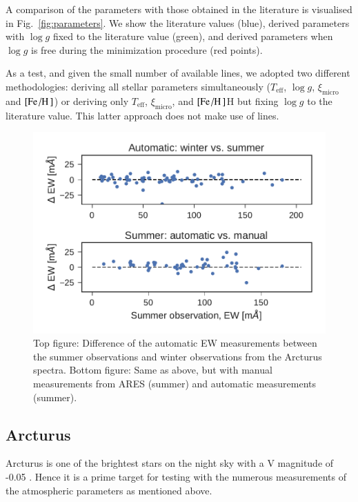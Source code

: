 \documentclass{aa}
\begin{document}
A comparison of the parameters with those obtained in the literature is visualised in
Fig.~\ref{fig:parameters}. We show the literature values (blue), derived parameters with $\log g$
fixed to the literature value (green), and derived parameters when $\log g$ is free during the
minimization procedure (red points).

As a test, and given the small number of available  lines, we adopted two different
methodologies: deriving all stellar parameters simultaneously ($T_\mathrm{eff}$, $\log g$,
$\xi_\mathrm{micro}$ and $[\ion{Fe}/\ion{H}]$) or deriving only $T_\mathrm{eff}$,
$\xi_\mathrm{micro}$, and $[\ion{Fe}/\ion{H}]$H but fixing $\log g$ to the literature value. This
latter approach does not make use of  lines.

\begin{figure}[htpb!]
    \centering
    \includegraphics[width=1.0\linewidth]{figures/EWcomp.pdf}
    \caption{Top figure: Difference of the automatic EW measurements between the
             summer observations and winter observations from the Arcturus
             spectra. Bottom figure: Same as above, but with manual measurements
             from ARES (summer) and automatic measurements (summer).}
    \label{fig:EWcomp}
\end{figure}


\subsection{Arcturus}
\label{sec:arcturus}

Arcturus is one of the brightest stars on the night sky with a V magnitude of
-0.05 \citep{Ducati2002}. Hence it is a prime target for testing with the
numerous measurements of the atmospheric parameters as mentioned above.
\end{document}
